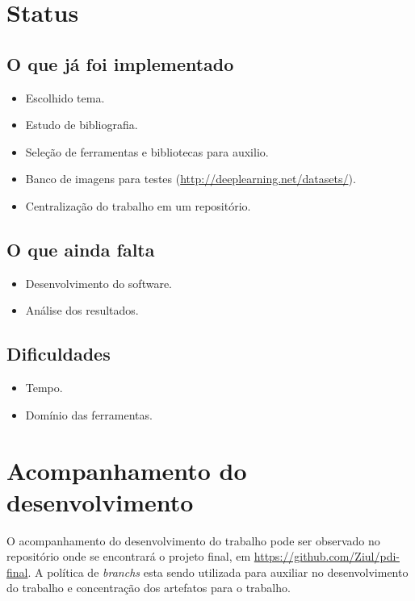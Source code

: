 \documentclass[conference]{IEEEtran}\newcommand{\journal}{false}
\begin{document}
% 
\onecolumn
\maketitle

\section*{Status} %
\label{sec:status}
    

    \subsection*{O que já foi implementado} %
    \label{sub:o_que_já_foi_implementado}

    \begin{itemize}
        \item Escolhido tema.
        \item Estudo de bibliografia.
        \item Seleção de ferramentas e bibliotecas para auxilio.
        \item Banco de imagens para testes (\url{http://deeplearning.net/datasets/}).
        \item Centralização do trabalho em um repositório.
    \end{itemize}
    
    \subsection*{O que ainda falta} %
    \label{sub:o_que_ainda_falta}

    \begin{itemize}
        \item Desenvolvimento do software.
        \item Análise dos resultados.
    \end{itemize}
    
    \subsection*{Dificuldades} %
    \label{sub:dificuldades}
    

    \begin{itemize}
        \item Tempo.
        \item Domínio das ferramentas.
    \end{itemize}

\section*{Acompanhamento do desenvolvimento} %
\label{sec:acompanhamento_do_desenvolvimento}

    O acompanhamento do desenvolvimento do trabalho pode ser observado no repositório onde se encontrará o projeto final, em \url{https://github.com/Ziul/pdi-final}. A política de \textit{branchs} esta sendo utilizada para auxiliar no desenvolvimento do trabalho e concentração dos artefatos para o trabalho.
\end{document}
